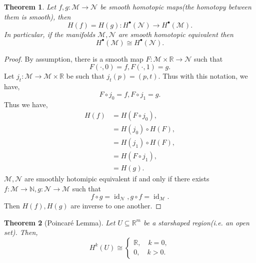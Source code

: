 \documentclass[8pt]{article}
\newtheorem{theorem}{Theorem} [section]
\DeclareMathOperator{\id}{id}
\newcommand{\N}[0]{\mathbb{N}}
\newcommand{\R}[0]{\mathbb{R}}
\newcommand{\M}[0]{\mathcal{M}}
\newcommand{\maniN}[0]{\mathcal{N}}
\begin{document}
\begin{theorem}
  Let $f,g:\M\to\maniN$ be smooth homotopic maps(the homotopy between them is smooth), then 
  \begin{equation*}
    H(f) = H(g):H^\bullet(\maniN)\to H^\bullet(\M).
  \end{equation*}
  In particular, if the manifolds $\M,\maniN$ are smooth homotopic equivalent then 
  \begin{equation*}
    H^\bullet(\M)\cong H^\bullet(\maniN).
  \end{equation*}
\end{theorem}
\begin{proof}
By assumption, there is a smooth map $F:\M\times\R\to\maniN$ such that 
\begin{equation*}
  F(\cdot,0) = f, F(\cdot,1) = g.
\end{equation*}
Let $j_t:\M\to\M\times\R$ be such that $j_t(p) = (p,t)$. Thus with this notation, we have,
\begin{equation*}
  F\circ j_0 = f,F\circ j_1 = g.
\end{equation*}
Thus we have,
\begin{align*}
  H(f) & = H(F\circ j_0),\\
  & = H(j_0)\circ H(F),\\
  & = H(j_1)\circ H(F), \\
  & = H(F\circ j_1),\\
  & = H(g).
\end{align*}
$\M,\maniN$ are smoothly hotomipic equivalent if and only if there exists $f:\M\to\N,g:\maniN\to\M$ such that 
\begin{equation*}
  f\circ g = \id_\maniN,g\circ f = \id_\M.
\end{equation*}
Then $H(f),H(g)$ are inverse to one another.
\end{proof}

\begin{theorem}[Poincaré Lemma]
  Let $U\subseteq\R^m$ be a starshaped region(i.e. an open set). Then, 
  \begin{equation*}
    H^k(U)\cong \begin{cases}
      \R,\quad k=0,\\
      0,\quad k>0.
    \end{cases}
  \end{equation*}
  \label{theorem_poincare_lemma}
\end{theorem}
\end{document}
